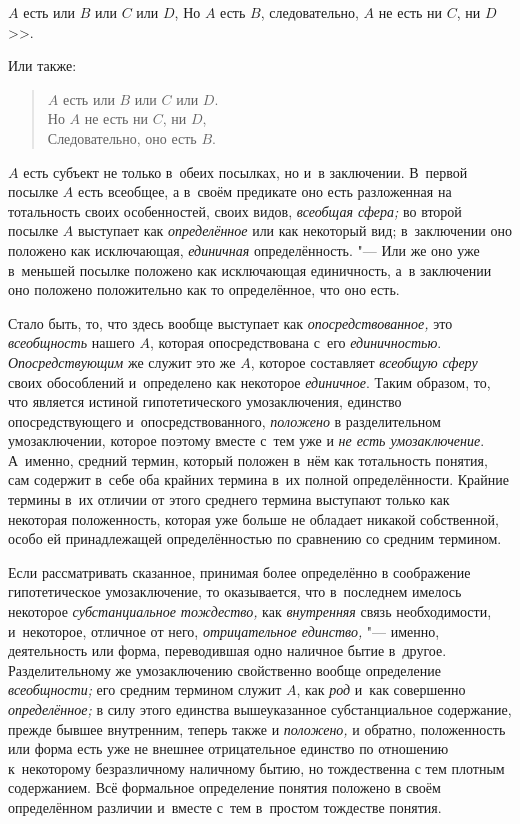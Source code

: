 $A$ есть или $B$ или $C$ или $D$,
Но $A$ есть $B$, следовательно, $A$ не есть ни $C$, ни $D$>>.

Или также:

\begin{verse}
$A$ есть или $B$ или $C$ или $D$.\\
Но $A$ не есть ни $C$, ни $D$,\\
Следовательно, оно есть $B$.
\end{verse}

$A$ есть субъект не только в~обеих посылках, но и~в заключении.
В~первой посылке $A$ есть всеобщее, а
в~своём предикате оно есть разложенная на тотальность своих особенностей,
своих видов, {\em всеобщая сфера;} во второй посылке $A$
выступает как {\em определённое} или
как некоторый вид; в~заключении оно положено как исключающая, {\em единичная}
определённость. "--- Или же оно уже в~меньшей
посылке положено как исключающая единичность, а~в заключении оно положено
положительно как то определённое, что оно есть.

Стало быть, то, что здесь вообще выступает как {\em опосредствованное,}
это {\em всеобщность} нашего $A$, которая опосредствована с~его
{\em единичностью}. {\em Опосредствующим} же служит это же $A$,
которое составляет {\em всеобщую сферу}
своих обособлений и~определено как некоторое {\em единичное}. Таким
образом, то, что является истиной гипотетического умозаключения, единство
опосредствующего и~опосредствованного, {\em положено} в
разделительном умозаключении, которое поэтому вместе с~тем уже и
{\em не есть умозаключение}.
А~именно, средний термин, который положен в~нём как
тотальность понятия, сам содержит в~себе оба крайних термина в~их полной
определённости. Крайние термины в~их отличии от этого среднего термина
выступают только как некоторая положенность, которая уже больше не обладает
никакой собственной, особо ей принадлежащей определённостью по сравнению со
средним термином.

Если рассматривать сказанное, принимая более определённо в
соображение гипотетическое умозаключение, то оказывается, что в~последнем
имелось некоторое {\em субстанциальное тождество,} как {\em внутренняя} связь
необходимости, и~некоторое, отличное от него,
{\em отрицательное единство,} "---
именно, деятельность или форма, переводившая одно наличное
бытие в~другое. Разделительному же умозаключению свойственно вообще
определение {\em всеобщности;} его средним термином служит $A$,
как {\em род} и~как совершенно {\em определённое;} в
силу этого единства вышеуказанное субстанциальное содержание, прежде бывшее
внутренним, теперь также и {\em положено,} и
обратно, положенность или форма есть уже не внешнее отрицательное единство
по отношению к~некоторому безразличному наличному бытию, но тождественна с
тем плотным содержанием. Всё формальное определение понятия положено в
своём определённом различии и~вместе с~тем в~простом тождестве понятия.

